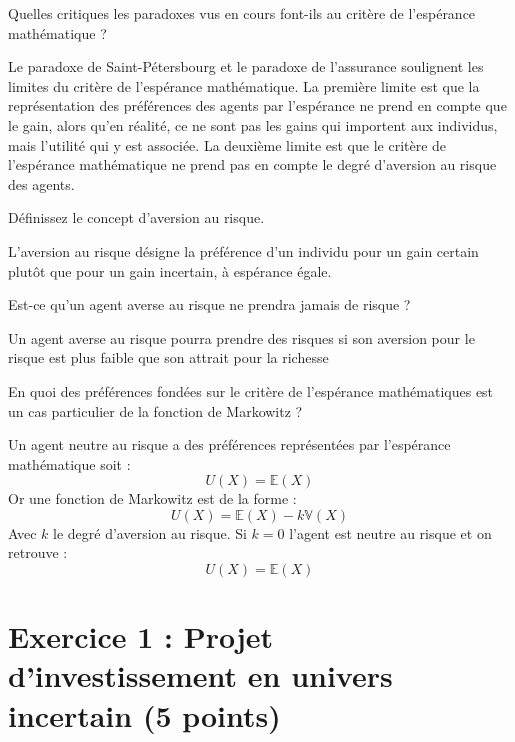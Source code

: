 \documentclass[12pt, a4paper]{exam}
\begin{document}
\begin{questions}
\question[1,25] Quelles critiques les paradoxes vus en cours font-ils au critère de l'espérance mathématique ?

\begin{solution}
Le paradoxe de Saint-Pétersbourg et le paradoxe de l'assurance soulignent les limites du critère de l'espérance mathématique. La première limite est que la représentation des préférences des agents par l'espérance ne prend en compte que le gain, alors qu'en réalité, ce ne sont pas les gains qui importent aux individus, mais l'utilité qui y est associée. La deuxième limite est que le critère de l'espérance mathématique ne prend pas en compte le degré d'aversion au risque des agents.
\end{solution}

\question[1,25] Définissez le concept d'aversion au risque.

\begin{solution}
L'aversion au risque désigne la préférence d'un individu pour un gain certain plutôt que pour un gain incertain, à espérance égale. 
\end{solution}	

\question[1,25] Est-ce qu'un agent averse au risque ne prendra jamais de risque ?

\begin{solution}
Un agent averse au risque pourra prendre des risques si son aversion pour le risque est plus faible que son attrait pour la richesse
\end{solution}	

\question[1,25] En quoi des préférences fondées sur le critère de l'espérance mathématiques est un cas particulier de la fonction de Markowitz ?

\begin{solution}
Un agent neutre au risque a des préférences représentées par l'espérance mathématique soit : \[ U(X)=\mathbb{E}(X) \] Or une fonction de Markowitz est de la forme : \[ U(X)=\mathbb{E}(X)-k\mathbb{V}(X) \] Avec \( k \) le degré d'aversion au risque. Si \( k = 0 \) l'agent est neutre au risque et on retrouve : \[ U(X)=\mathbb{E}(X) \]
\end{solution}
\end{questions}
\section*{Exercice 1 : Projet d'investissement en univers incertain (5 points)}
\end{document}
